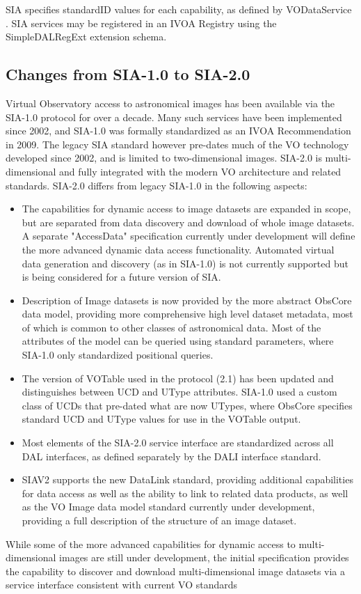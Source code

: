 \documentclass[11pt,a4paper]{ivoa}
\begin{document}
SIA specifies standardID values for each capability, as defined by VODataService \citep{std:VODS11}. SIA services may be registered in an IVOA Registry using the SimpleDALRegExt \citep{std:DALREGEXT} extension schema.
\subsection{Changes from SIA-1.0 to SIA-2.0}

Virtual Observatory access to astronomical images has been available via the SIA-1.0 protocol for over a decade.  Many such services have been implemented since 2002, and SIA-1.0 \citep{std:SIAP} was formally standardized as an IVOA Recommendation in 2009.  The legacy SIA standard however pre-dates much of the VO technology developed since 2002, and is limited to two-dimensional images.  SIA-2.0 is multi-dimensional and fully integrated with the modern VO architecture and related standards.
SIA-2.0 differs from legacy SIA-1.0 in the following aspects:
\begin{itemize}
    \item The capabilities for dynamic access to image datasets are expanded in scope, but are separated from data discovery and download of whole image datasets.  A separate "AccessData" specification currently under development will define the more advanced dynamic data access functionality.  Automated virtual data generation and discovery (as in SIA-1.0) is not currently supported but is being considered for a future version of SIA.
    \item Description of Image datasets is now provided by the more abstract ObsCore data model, providing more comprehensive high level dataset metadata, most of which is common to other classes of astronomical data. Most of the attributes of the model can be queried using standard parameters, where SIA-1.0 only standardized positional queries. 
    \item The version of VOTable   used  in the protocol (2.1) has been updated  and distinguishes between UCD and UType attributes. SIA-1.0 used a custom class of UCDs that pre-dated what are now UTypes, where ObsCore specifies standard UCD and UType values for use in the VOTable output.
    \item Most elements of the SIA-2.0 service interface are standardized across all DAL interfaces, as defined separately by the DALI  interface standard.
    \item SIAV2  supports the new DataLink  standard, providing additional capabilities for data access as well as the ability to link to related data products, as well as the VO Image data model standard currently under development, providing a full description of the structure of an image dataset.
\end{itemize}
While some of the more advanced capabilities for dynamic access to multi-dimensional images are still under development, the initial specification provides the capability to discover and download multi-dimensional image datasets via a service interface consistent with current VO standards
\end{document}

